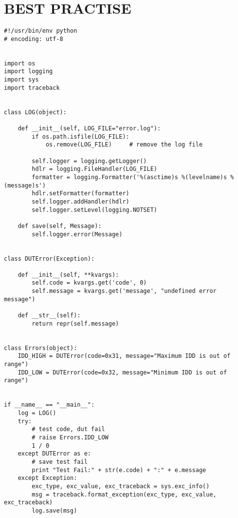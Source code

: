 \documentclass{article}
\begin{document}
\newpage
\section{BEST PRACTISE}
\begin{lstlisting}
#!/usr/bin/env python
# encoding: utf-8


import os
import logging
import sys
import traceback


class LOG(object):

    def __init__(self, LOG_FILE="error.log"):
        if os.path.isfile(LOG_FILE):
            os.remove(LOG_FILE)     # remove the log file

        self.logger = logging.getLogger()
        hdlr = logging.FileHandler(LOG_FILE)
        formatter = logging.Formatter('%(asctime)s %(levelname)s %(message)s')
        hdlr.setFormatter(formatter)
        self.logger.addHandler(hdlr)
        self.logger.setLevel(logging.NOTSET)

    def save(self, Message):
        self.logger.error(Message)


class DUTError(Exception):

    def __init__(self, **kvargs):
        self.code = kvargs.get('code', 0)
        self.message = kvargs.get('message', "undefined error message")

    def __str__(self):
        return repr(self.message)


class Errors(object):
    IDD_HIGH = DUTError(code=0x31, message="Maximum IDD is out of range")
    IDD_LOW = DUTError(code=0x32, message="Minimum IDD is out of range")


if __name__ == "__main__":
    log = LOG()
    try:
        # test code, dut fail
        # raise Errors.IDD_LOW
        1 / 0
    except DUTError as e:
        # save test fail
        print "Test Fail:" + str(e.code) + ":" + e.message
    except Exception:
        exc_type, exc_value, exc_traceback = sys.exc_info()
        msg = traceback.format_exception(exc_type, exc_value, exc_traceback)
        log.save(msg)

\end{lstlisting}
\end{document}
